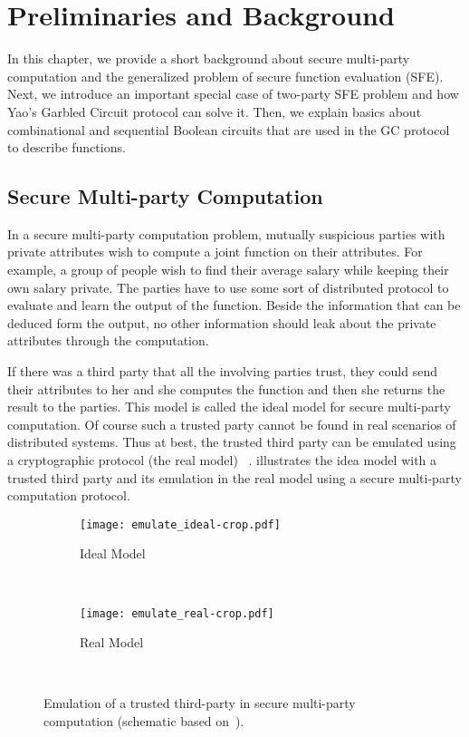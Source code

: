 \chapter{Preliminaries and Background}\label{ch:prelim}
In this chapter, we provide a short background about secure multi-party computation and the generalized problem of secure function evaluation (SFE).
Next, we introduce an important special case of two-party SFE problem and how Yao's Garbled Circuit protocol can solve it.
Then, we explain basics about combinational and sequential Boolean circuits that are used in the GC protocol to describe functions.

\section{Secure Multi-party Computation}\label{sec:prelim-smc}
In a secure multi-party computation problem, mutually suspicious parties with private attributes wish to compute a joint function on their attributes.
For example, a group of people wish to find their average salary while keeping their own salary private.
The parties have to use some sort of distributed protocol to evaluate and learn the output of the function.
Beside the information that can be deduced form the output, no other information should leak about the private attributes through the computation.

If there was a third party that all the involving parties trust, they could send their attributes to her and she computes the function and then she returns the result to the parties.
This model is called the ideal model for secure multi-party computation.
Of course such a trusted party cannot be found in real scenarios of distributed systems.
Thus at best, the trusted third party can be emulated using a cryptographic protocol (the real model) ~\cite{goldreich2013general}.
 illustrates the idea model with a trusted third party and its emulation in the real model using a secure multi-party computation protocol.

\begin{figure}[ht]
    \centering
    \begin{subfigure}[tl]{0.35\textwidth}
        \texttt{[image: emulate\_ideal-crop.pdf]}
        \caption{Ideal Model}\label{fig:ideal-model}
    \end{subfigure}
		~~~~
    \begin{subfigure}[tr]{0.35\textwidth}
        \texttt{[image: emulate\_real-crop.pdf]}
        \caption{Real Model}\label{fig:real-model}
    \end{subfigure}\\
    \caption{Emulation of a trusted third-party in secure multi-party computation (schematic based on~\cite{goldreich2013general}).}\label{fig:multi-party-model}
\end{figure}


